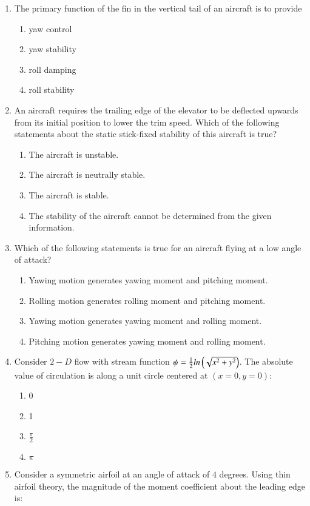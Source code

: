 \documentclass[journal]{IEEEtran}
\begin{document}
\begin{enumerate}[start=35]
\item The primary function of the fin in the vertical tail of an aircraft is to provide
\begin{enumerate}
    \item yaw control
    \item yaw stability
    \item roll damping
    \item roll stability
\end{enumerate}
\item An aircraft requires the trailing edge of the elevator to be deflected upwards from its initial position to lower the trim speed. Which of the following statements about the static stick-fixed stability of this aircraft is true?
\begin{enumerate}
    \item The aircraft is unstable.
    \item The aircraft is neutrally stable.
    \item The aircraft is stable.
    \item The stability of the aircraft cannot be determined from the given information.
\end{enumerate}
\item Which of the following statements is true for an aircraft flying at a low angle of attack?
\begin{enumerate}
    \item Yawing motion generates yawing moment and pitching moment.
    \item Rolling motion generates rolling moment and pitching moment.
    \item Yawing motion generates yawing moment and rolling moment.
    \item Pitching motion generates yawing moment and rolling moment.
\end{enumerate}
\item Consider $2-D$ flow with stream function $\psi = \frac{1}{2}ln\left(\sqrt{x^2+y^2}\right)$. The absolute value of circulation is along a unit circle centered at $(x = 0, y = 0)$:
\begin{enumerate}
    \item 0
    \item 1
    \item $\frac{\pi}{2}$
    \item $\pi$
\end{enumerate}
\item Consider a symmetric airfoil at an angle of attack of $4$ degrees. Using thin airfoil theory, the magnitude of the moment coefficient about the leading edge is:

\end{enumerate}
\end{document}
